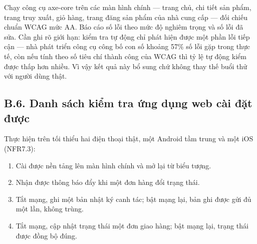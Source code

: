 Chạy công cụ axe-core trên các màn hình chính --- trang chủ, chi tiết sản phẩm,
trang truy xuất, giỏ hàng, trang đăng sản phẩm của nhà cung cấp --- đối chiếu
chuẩn WCAG mức AA. Báo cáo số lỗi theo mức độ nghiêm trọng và số lỗi đã sửa.
Cần ghi rõ giới hạn: kiểm tra tự động chỉ phát hiện được một phần lỗi tiếp
cận --- nhà phát triển công cụ công bố con số khoảng 57\% số lỗi gặp trong thực
tế, còn nếu tính theo số tiêu chí thành công của WCAG thì tỷ lệ tự động kiểm
được thấp hơn nhiều. Vì vậy kết quả này bổ sung chứ không thay thế buổi thử với
người dùng thật.

\subsection*{B.6. Danh sách kiểm tra ứng dụng web cài đặt được}

Thực hiện trên tối thiểu hai điện thoại thật, một Android tầm trung và một iOS
(NFR7.3):
\begin{enumerate}
    \item Cài được nền tảng lên màn hình chính và mở lại từ biểu tượng.
    \item Nhận được thông báo đẩy khi một đơn hàng đổi trạng thái.
    \item Tắt mạng, ghi một bản nhật ký canh tác; bật mạng lại, bản ghi được gửi
    đủ một lần, không trùng.
    \item Tắt mạng, cập nhật trạng thái một đơn giao hàng; bật mạng lại, trạng
    thái được đồng bộ đúng.
\end{enumerate}
